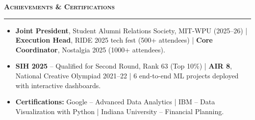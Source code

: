 \documentclass[a4paper,10pt]{article}
\newcommand{\sectionHeader}[2]{%
  \vspace{5pt}%
  \noindent%
  {\normalsize\bfseries\color{HeaderDark}#2\enspace\textsc{#1}}%
  \\[-6pt]%
  {\color{SectionLine}\rule{\textwidth}{1pt}}%
  \vspace{1pt}\par%
}
\begin{document}

\sectionHeader{Achievements \& Certifications}{\faTrophy}

\begin{itemize}[leftmargin=14pt, itemsep=0pt, parsep=0pt, topsep=1pt, label={\color{BulletColor}$\bullet$}]
  \item {\small \textbf{Joint President}, Student Alumni Relations Society, MIT-WPU (2025--26) {\color{SubText}|} \textbf{Execution Head}, RIDE 2025 tech fest (500+ attendees) {\color{SubText}|} \textbf{Core Coordinator}, Nostalgia 2025 (1000+ attendees).}
  \item {\small \textbf{SIH 2025} -- Qualified for Second Round, Rank 63 (Top 10\%) {\color{SubText}|} \textbf{AIR 8}, National Creative Olympiad 2021--22 {\color{SubText}|} 6 end-to-end ML projects deployed with interactive dashboards.}
  \item {\small \textbf{Certifications:} Google -- Advanced Data Analytics {\color{SubText}|} IBM -- Data Visualization with Python {\color{SubText}|} Indiana University -- Financial Planning.}
\end{itemize}

\end{document}
